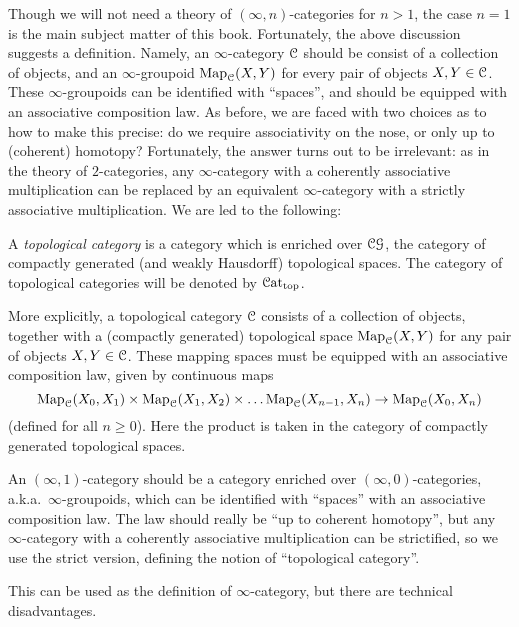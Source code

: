 \begin{1.1.1 Goals and Obstacles}
Though we will not need a theory of $(\infty,n)$-categories for $n > 1$, the case $n=1$ is the main subject matter of this book. Fortunately, the above discussion suggests a definition. Namely, an $\infty$-category $\operatorname{\mathcal{C}}$ should be consist of a collection of objects, and an $\infty$-groupoid 
$\operatorname{{Map}}_{\operatorname{\mathcal{C}}}(X,Y)$ for every pair of objects $X,Y \in \operatorname{\mathcal{C}}$. These $\infty$-groupoids can be identified with ``spaces'', and should be equipped with an associative composition law.
As before, we are faced with two choices as to how to make this
precise: do we require associativity on the nose, or only up to (coherent)
homotopy? Fortunately, the answer turns out to be irrelevant:
as in the theory of $2$-categories, any $\infty$-category
with a coherently associative multiplication can be replaced by an
equivalent $\infty$-category with a strictly associative
multiplication. We are led to the following:

\begin{definition}\label{ic}
A {\it topological category} is a category which is enriched over
$\operatorname{\mathcal{C}\mathcal{G}}$, the category of compactly generated (and weakly Hausdorff) topological
spaces. The category of topological categories will be denoted by
$\operatorname{\mathcal{C}at_{\text{top}}}$.
\end{definition}

More explicitly, a topological category $\operatorname{\mathcal{C}}$ consists of a
collection of objects, together with a (compactly generated)
topological space $\operatorname{{Map}}_{\operatorname{\mathcal{C}}}(X,Y)$ for any pair of objects $X,Y
\in \operatorname{\mathcal{C}}$. These mapping spaces must be equipped with an
associative composition law, given by continuous maps
$$\operatorname{{Map}}_{\operatorname{\mathcal{C}}}(X_0, X_1) \times \operatorname{{Map}}_{\operatorname{\mathcal{C}}}(X_1, X_2) \times
\ldots \operatorname{{Map}}_{\operatorname{\mathcal{C}}}(X_{n-1},X_n) \rightarrow
\operatorname{{Map}}_{\operatorname{\mathcal{C}}}(X_0,X_n)$$ (defined for all $n \geq 0$). Here the
product is taken in the category of compactly generated
topological spaces.
\begin{shaded}
An $(\infty,1)$-category should be a category enriched over $(\infty,0)$-categories, a.k.a.\ $\infty$-groupoids, which can be identified with ``spaces'' with an associative composition law. The law should really be ``up to coherent homotopy'', but any $\infty$-category
with a coherently associative multiplication can be strictified, so we use the strict version, defining the notion of ``topological category''.

This can be used as the definition of $\infty$-category, but there are technical disadvantages.
\end{shaded}


\end{1.1.1 Goals and Obstacles}
